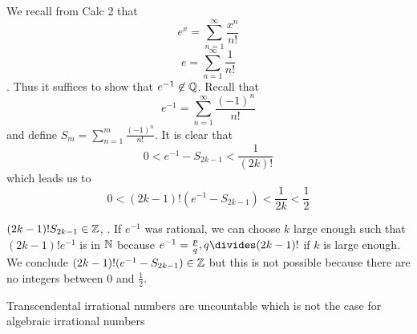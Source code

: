 \begin{solution}
	We recall from Calc 2 that
	\[
		e^x = \sum_{n=1}^{\infty} \frac{x^n}{n!}
	\]
	\[
		e = \sum_{n=1}^{\infty} \frac{1}{n!}
	\].
	Thus it suffices to show that \( e^{-1} \not \in \mathbb{Q} \). Recall that
	\[
		e^{-1} = \sum_{n=1}^{\infty} \frac{(-1)^n}{n!}
	\]
	and define \( S_m = \sum_{n=1}^{m} \frac{(-1)^n}{n!} \). It is clear that
	\[
		0 < e^{-1} - S_{2k-1} < \frac{1}{(2k)!}
	\]
	which leads us to
	\[
		0 < (2k-1)! (e^{-1}-S_{2k-1}) < \frac{1}{2k} < \frac{1}{2}
	\]

	\( (2k-1)!S_{2k-1} \in \mathbb{Z} \),
	.
	If \( e^{-1} \) was rational, we can choose \( k \) large enough such that
	\( (2k-1)!e^{-1} \) is in \( \mathbb{N} \) because \( e^{-1} = \frac{p}{q}, q \divides
	(2k-1)! \) if \( k \) is large enough. We conclude \( (2k-1)!(e^{-1}-S_{2k-1}) \in \mathbb{Z} \) but
	this is not possible because there are no integers between \( 0 \) and
	\( \frac{1}{2} \).
\end{solution}

\begin{note}
	Transcendental irrational numbers are uncountable which is not the case for algebraic
	irrational numbers
\end{note}
